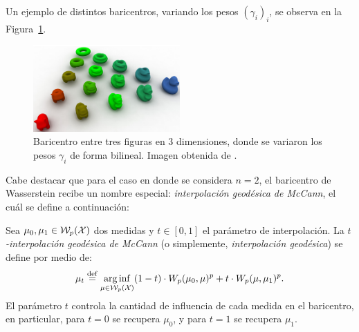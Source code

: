 Un ejemplo de distintos baricentros, variando los pesos $(\gamma_i)_i$, se observa en la Figura~\ref{fig:baricentro-Wass-3d}.

\begin{figure}[H]
    \centering
    \includegraphics[width=0.5\textwidth]{img/transporte/baricentro-Wass-3d.png}
    \caption{Baricentro entre tres figuras en 3 dimensiones, donde se variaron los pesos $\gamma_i$ de forma bilineal. Imagen obtenida de \cite{solomon2015convolutional}.}
    \label{fig:baricentro-Wass-3d}
\end{figure}


Cabe destacar que para el caso en donde se considera $n = 2$, el baricentro de Wasserstein recibe un nombre especial: \textit{interpolación geodésica de McCann}, el cuál se define a continuación:

\begin{definition}
    Sea $\mu_0, \mu_1 \in \WassersteinSpace[p]{\cX} $ dos medidas y $t \in [0, 1]$ el parámetro de interpolación. La \emph{$t$-interpolación geodésica de McCann} (o simplemente, \emph{interpolación geodésica}) se define por medio de:
    \begin{equation}\label{eq:interpolacion-geodesica}
        \mu_t \eqdef \arginf_{\mu \in \WassersteinSpace[p]{\cX} } (1-t) \cdot \Wasserstein[p]{\mu_0}{\mu}^p + t \cdot \Wasserstein[p]{\mu}{\mu_1}^p.
    \end{equation}
    El parámetro $t$ controla la cantidad de influencia de cada medida en el baricentro, en particular, para $t = 0$ se recupera $\mu_0$, y para $t = 1$ se recupera $\mu_1$.
\end{definition}




